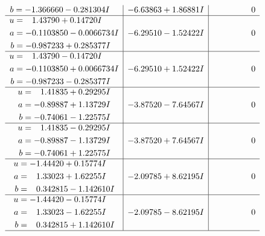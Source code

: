 \documentclass[1p]{elsarticle_modified}
\theoremstyle{definition}
\begin{document}
$$\begin{array}{c|c|c}
\begin{aligned}
b &= -1.366660 - 0.281304 I\end{aligned}
 & -6.63863 + 1.86881 I & \phantom{-0.000000 } 0 \\ \hline\begin{aligned}
u &= \phantom{-}1.43790 + 0.14720 I \\
a &= -0.1103850 - 0.0066734 I \\
b &= -0.987233 + 0.285377 I\end{aligned}
 & -6.29510 - 1.52422 I & \phantom{-0.000000 } 0 \\ \hline\begin{aligned}
u &= \phantom{-}1.43790 - 0.14720 I \\
a &= -0.1103850 + 0.0066734 I \\
b &= -0.987233 - 0.285377 I\end{aligned}
 & -6.29510 + 1.52422 I & \phantom{-0.000000 } 0 \\ \hline\begin{aligned}
u &= \phantom{-}1.41835 + 0.29295 I \\
a &= -0.89887 + 1.13729 I \\
b &= -0.74061 - 1.22575 I\end{aligned}
 & -3.87520 - 7.64567 I & \phantom{-0.000000 } 0 \\ \hline\begin{aligned}
u &= \phantom{-}1.41835 - 0.29295 I \\
a &= -0.89887 - 1.13729 I \\
b &= -0.74061 + 1.22575 I\end{aligned}
 & -3.87520 + 7.64567 I & \phantom{-0.000000 } 0 \\ \hline\begin{aligned}
u &= -1.44420 + 0.15774 I \\
a &= \phantom{-}1.33023 + 1.62255 I \\
b &= \phantom{-}0.342815 - 1.142610 I\end{aligned}
 & -2.09785 + 8.62195 I & \phantom{-0.000000 } 0 \\ \hline\begin{aligned}
u &= -1.44420 - 0.15774 I \\
a &= \phantom{-}1.33023 - 1.62255 I \\
b &= \phantom{-}0.342815 + 1.142610 I\end{aligned}
 & -2.09785 - 8.62195 I & \phantom{-0.000000 } 0\\
 \hline 
 \end{array}$$\newpage$$\begin{array}{c|c|c}  

\end{array}$$
\end{document}
